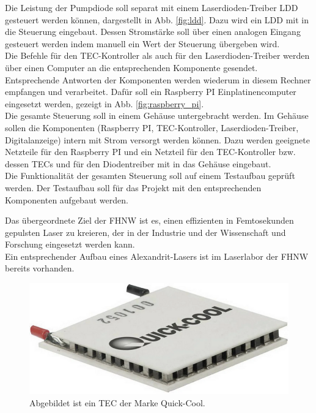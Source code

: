 Die Leistung der Pumpdiode soll separat mit einem Laserdioden-Treiber LDD gesteuert werden können, dargestellt in Abb. \ref{fig:ldd}. Dazu wird ein LDD mit in die Steuerung eingebaut. Dessen Stromstärke soll über einen analogen Eingang gesteuert werden indem manuell ein Wert der Steuerung übergeben wird.\\
Die Befehle für den TEC-Kontroller als auch für den Laserdioden-Treiber werden über einen Computer an die entsprechenden Komponente gesendet. Entsprechende Antworten der Komponenten werden wiederum in diesem Rechner empfangen und verarbeitet. Dafür soll ein Raspberry PI Einplatinencomputer eingesetzt werden, gezeigt in Abb. \ref{fig:raspberry_pi}.\\

Die gesamte Steuerung soll in einem Gehäuse untergebracht werden. Im Gehäuse sollen die Komponenten  (Raspberry PI, TEC-Kontroller, Laserdioden-Treiber, Digitalanzeige) intern mit Strom versorgt werden können. Dazu werden geeignete Netzteile für den Raspberry PI und ein Netzteil für den TEC-Kontroller bzw. dessen TECs und für den Diodentreiber mit in das Gehäuse eingebaut.\\
Die Funktionalität der gesamten Steuerung soll auf einem Testaufbau geprüft werden. Der Testaufbau soll für das Projekt mit den entsprechenden Komponenten aufgebaut werden.\\
\label{chptr:_einleitung}

Das übergeordnete Ziel der FHNW ist es, einen effizienten in Femtosekunden gepulsten Laser zu kreieren, der in der Industrie und der Wissenschaft und Forschung eingesetzt werden kann.\\
Ein entsprechender Aufbau eines Alexandrit-Lasers ist im Laserlabor der FHNW bereits vorhanden.\\

\begin{figure}[H]
    \centering
    \includegraphics[scale=0.5]{98_images/peltier_modul.PNG}
    \caption{Abgebildet ist ein TEC der Marke Quick-Cool.}
    \label{fig:peltierelement}
\end{figure}

